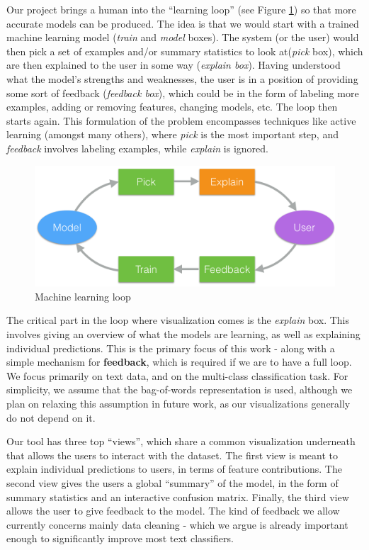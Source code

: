 \documentclass{chi2009}
\begin{document}
Our project brings a human into the “learning loop” (see Figure \ref{hmloop}) so
that more accurate models can be produced. The idea is that we would start with
a trained machine learning
model (\emph{train} and \emph{model} boxes). The system (or the user) would then
pick a set of examples and/or summary statistics to look at(\emph{pick} box),
which are then explained to the user in some way (\emph{explain box}). Having
understood what the model's strengths and weaknesses, the user is in a position
of providing some sort of feedback (\emph{feedback box}), which could be in the
form of labeling more examples, adding or removing features, changing models,
etc. The loop then starts again. This formulation of the problem encompasses
techniques like active learning (amongst many others), where \emph{pick} is the
most important step, and \emph{feedback} involves labeling examples, while
\emph{explain} is ignored.

\begin{figure}[hb]
\includegraphics[width=.5\textwidth]{feedback_loop_cropped.pdf}
\caption{Machine learning loop}
\label{hmloop}
\end{figure}

The critical part in the loop where visualization comes is the \emph{explain}
box. This involves giving an overview of what the models are learning, as well
as explaining individual predictions. This is the primary focus of this work -
along with a simple mechanism for \textbf{feedback}, which is required if we are
to have a full loop. We focus primarily on text data, and on the multi-class
classification task. For simplicity, we assume that the bag-of-words
representation is used, although we plan on relaxing this assumption in future
work, as our visualizations generally do not depend on it.

Our tool has three top ``views'', which share a common visualization underneath
that allows the users to interact with the dataset. The first view is meant to explain
individual predictions to users, in terms of feature contributions. The second
view gives the users a global ``summary'' of the model, in the form of summary
statistics and an interactive confusion matrix. Finally, the third view allows
the user to give feedback to the model. The kind of feedback we allow currently
concerns mainly data cleaning - which we argue is already important enough to
significantly improve most text classifiers.
\end{document}
